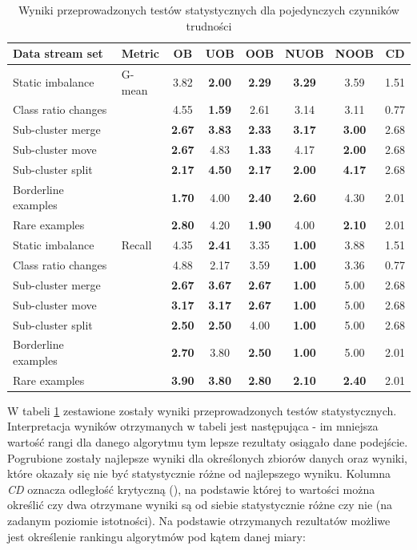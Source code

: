 \begin{table}[ht]
\centering\small%
\setlength{\tabcolsep}{10pt} 
\renewcommand{\arraystretch}{1.5} 
\begin{tabular}{l l c c c c c c}
\toprule
Data stream set & Metric & OB & UOB & OOB & NUOB & NOOB & CD \\
\midrule
Static imbalance & G-mean & 3.82 & \textbf{2.00} & \textbf{2.29} & \textbf{3.29} & 3.59 & 1.51 \\
Class ratio changes & & 4.55 & \textbf{1.59} & 2.61 & 3.14 & 3.11 & 0.77 \\
Sub-cluster merge & & \textbf{2.67} & \textbf{3.83} & \textbf{2.33} & \textbf{3.17} & \textbf{3.00} & 2.68 \\
Sub-cluster move & & \textbf{2.67} & 4.83 & \textbf{1.33} & 4.17 & \textbf{2.00} & 2.68 \\
Sub-cluster split & & \textbf{2.17} & \textbf{4.50} & \textbf{2.17} & \textbf{2.00} & \textbf{4.17} & 2.68 \\
Borderline examples & & \textbf{1.70} & 4.00 & \textbf{2.40} & \textbf{2.60} & 4.30 & 2.01 \\
Rare examples & & \textbf{2.80} & 4.20 & \textbf{1.90} & 4.00 & \textbf{2.10} & 2.01 \\
Static imbalance & Recall & 4.35 & \textbf{2.41} & 3.35 & \textbf{1.00} & 3.88 & 1.51 \\
Class ratio changes & & 4.88 & 2.17 & 3.59 & \textbf{1.00} & 3.36 & 0.77 \\
Sub-cluster merge & & \textbf{2.67} & \textbf{3.67} & \textbf{2.67} & \textbf{1.00} & 5.00 & 2.68 \\
Sub-cluster move & & \textbf{3.17} & \textbf{3.17} & \textbf{2.67} & \textbf{1.00} & 5.00 & 2.68 \\
Sub-cluster split & & \textbf{2.50} & \textbf{2.50} & 4.00 & \textbf{1.00} & 5.00 & 2.68 \\
Borderline examples & & \textbf{2.70} & 3.80 & \textbf{2.50} & \textbf{1.00} & 5.00 & 2.01 \\
Rare examples & & \textbf{3.90} & \textbf{3.80} & \textbf{2.80} & \textbf{2.10} & \textbf{2.40} & 2.01 \\
\bottomrule
\end{tabular}
\caption{Wyniki przeprowadzonych testów statystycznych dla pojedynczych czynników trudności}\label{Tab:SingleDriftFriedman}
\end{table}

\noindent W tabeli \ref{Tab:SingleDriftFriedman} zestawione zostały wyniki przeprowadzonych testów statystycznych. Interpretacja wyników otrzymanych w tabeli jest następująca - im mniejsza wartość rangi dla danego algorytmu tym lepsze rezultaty osiągało dane podejście. Pogrubione zostały najlepsze wyniki dla określonych zbiorów danych oraz wyniki, które okazały się nie być statystycznie różne od najlepszego wyniku. Kolumna \textit{CD} oznacza odległość krytyczną (), na podstawie której to wartości można określić czy dwa otrzymane wyniki są od siebie statystycznie różne czy nie (na zadanym poziomie istotności). Na podstawie otrzymanych rezultatów możliwe jest określenie rankingu algorytmów pod kątem danej miary:

